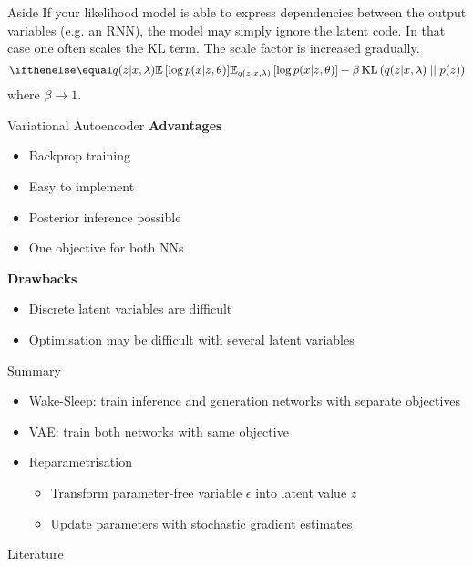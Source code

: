 \documentclass[14pt]{beamer}
\begin{document}
\begin{frame}{Aside}
If your likelihood model is able to express dependencies between the output variables (e.g. an RNN), the model may simply ignore the latent code.
In that case one often scales the KL term. The scale factor is increased gradually.
\begin{equation*}
\E[q(z|x,\lambda)]{\log p(x|z,\theta)} - \beta \KL{q(z|x,\lambda)}{p(z)}
\end{equation*}
where $ \beta \rightarrow 1 $.
\end{frame}

\begin{frame}{Variational Autoencoder}
\textbf{Advantages}
\begin{itemize}
\item Backprop training
\item Easy to implement
\item Posterior inference possible
\item One objective for both NNs
\end{itemize}
\pause
\textbf{Drawbacks}
\begin{itemize}
\item Discrete latent variables are difficult
\item Optimisation may be difficult with several latent variables
\end{itemize}
\end{frame}

\begin{frame}{Summary}
\begin{itemize}
\item Wake-Sleep: train inference and generation networks with separate objectives
\item VAE: train both networks with same objective
\item Reparametrisation
\begin{itemize}
\item  Transform parameter-free variable $ \epsilon $ into latent value $ z $
\item Update parameters with stochastic gradient estimates
\end{itemize}
\end{itemize}
\end{frame}

\begin{frame}[allowframebreaks]{Literature}
\nocite{KingmaWelling:2013}
\nocite{HintonEtAl:1995}
\nocite{RezendeEtAl:2014}
\nocite{TitsiasLazarogredilla:2014}
\nocite{KucukelbirEtAl:2017}



\end{frame}
\end{document}
